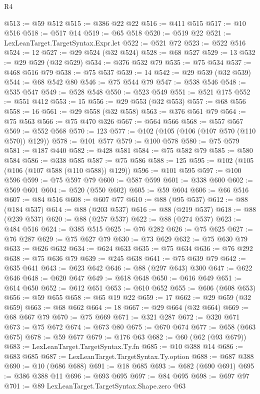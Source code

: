 \begin{lexlean}{R4}
\begin{coremodule}
{{{{{{{{{{{{{{{{{{{{{{{{{{{{{{{{{{{{{{{{{{{{{{{{{{{{{{{{{{{{{{{{{{{{{{{{{{{{{{{{{{{{{{{{{{{{@513 := @59 @512
@515 := @386 @22 @22
@516 := @411 @515
@517 := @10 @516
@518 := @517 @14
@519 := @65 @518
@520 := @519 @22
@521 := LexLeanTarget.TargetSyntax.Expr.let
@522 := @521 @72
@523 := @522 @516
@524 := 12
@527 := @29 @524 (@32 @524)
@528 := @68 @527
@529 := 13
@532 := @29 @529 (@32 @529)
@534 := @376 @532 @79
@535 := @75 @534
@537 := @468 @516 @79
@538 := @75 @537
@539 := 14
@542 := @29 @539 (@32 @539)
@544 := @68 @542 @80
@546 := @75 @544 @79
@547 := @538 @546
@548 := @535 @547
@549 := @528 @548
@550 := @523 @549
@551 := @521 @175
@552 := @551 @412
@553 := 15
@556 := @29 @553 (@32 @553)
@557 := @68 @556
@558 := 16
@561 := @29 @558 (@32 @558)
@563 := @376 @561 @79
@564 := @75 @563
@566 := @75 @470 @326
@567 := @564 @566
@568 := @557 @567
@569 := @552 @568
@570 := 123
@577 := @102 (@105 (@106 (@107 @570 (@110 @570)) @129))
@578 := @101 @577
@579 := @100 @578
@580 := @75 @579
@581 := @187 @440
@582 := @428 @581
@584 := @75 @582 @79
@585 := @580 @584
@586 := @338 @585
@587 := @75 @586
@588 := 125
@595 := @102 (@105 (@106 (@107 @588 (@110 @588)) @129))
@596 := @101 @595
@597 := @100 @596
@599 := @75 @597 @79
@600 := @587 @599
@601 := @338 @600
@602 := @569 @601
@604 := @520 (@550 @602)
@605 := @59 @604
@606 := @66 @516
@607 := @84 @516
@608 := @607 @77
@610 := @88 (@95 @537)
@612 := @88 (@184 @537)
@614 := @88 (@203 @537)
@616 := @88 (@219 @537)
@618 := @88 (@239 @537)
@620 := @88 (@257 @537)
@622 := @88 (@274 @537)
@623 := @484 @516
@624 := @385 @515
@625 := @76 @282
@626 := @75 @625
@627 := @76 @287
@629 := @75 @627 @79
@630 := @73 @629
@632 := @75 @630 @79
@633 := @626 @632
@634 := @624 @633
@635 := @75 @634
@636 := @76 @292
@638 := @75 @636 @79
@639 := @245 @638
@641 := @75 @639 @79
@642 := @635 @641
@643 := @623 @642
@646 := @88 (@297 @643) @300
@647 := @622 @646
@648 := @620 @647
@649 := @618 @648
@650 := @616 @649
@651 := @614 @650
@652 := @612 @651
@653 := @610 @652
@655 := @606 (@608 @653)
@656 := @59 @655
@658 := @65 @19 @22
@659 := 17
@662 := @29 @659 (@32 @659)
@663 := @68 @662
@664 := 18
@667 := @29 @664 (@32 @664)
@669 := @68 @667 @79
@670 := @75 @669
@671 := @321 @287
@672 := @320 @671
@673 := @75 @672
@674 := @673 @80
@675 := @670 @674
@677 := @658 (@663 @675)
@678 := @59 @677
@679 := @176 @63
@682 := @60 (@62 (@93 @679))
@683 := LexLeanTarget.TargetSyntax.Ty.fn
@685 := @10 @388 @14
@686 := @683 @685
@687 := LexLeanTarget.TargetSyntax.Ty.option
@688 := @687 @388
@690 := @10 (@686 @688)
@691 := @18 @685
@693 := @682 (@690 @691)
@695 := @386 @388 @11
@696 := @693 @695
@697 := @84 @695
@698 := @697 @97
@701 := @89 LexLeanTarget.TargetSyntax.Shape.zero @63
}}}}}}}}}}}}}}}}}}}}}}}}}}}}}}}}}}}}}}}}}}}}}}}}}}}}}}}}}}}}}}}}}}}}}}}}}}}}}}}}}}}}}}}}}}}}
\end{coremodule}
\end{lexlean}

